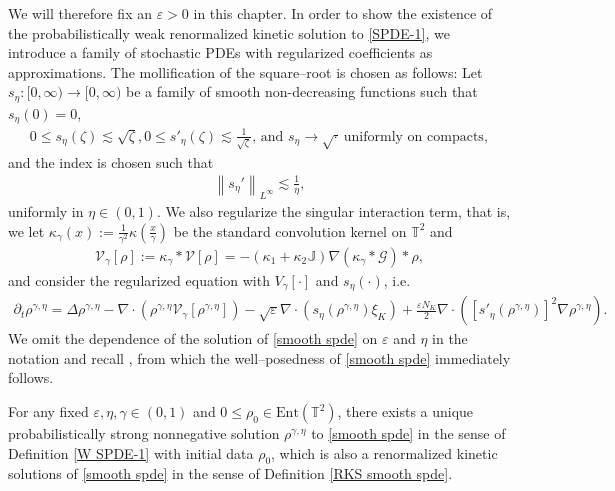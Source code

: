 We will therefore fix an $\varepsilon > 0$ in this chapter. In order to show the existence of the probabilistically weak renormalized kinetic solution to \eqref{SPDE-1}, we introduce a family of stochastic PDEs with regularized coefficients as approximations. The mollification of the square--root is chosen as follows: Let $s_{\eta}:[0, \infty) \rightarrow[0, \infty)$ be a family of smooth non-decreasing functions such that $s_{\eta}(0)=0$, 
\begin{align}
0 \leqslant s_{\eta}(\zeta) \lesssim \sqrt{\zeta}, 0 \leq s'_{\eta}(\zeta) \lesssim \frac{1}{\sqrt{\zeta}} \text {, and } s_{\eta} \to \sqrt{\cdot} \ \text{uniformly on compacts},
\end{align}
and the index is chosen such that
\begin{align}
\left\|s_{\eta}'\right\|_{L^{\infty}} \lesssim \frac{1}{\eta},
\end{align}
uniformly in $\eta \in (0,1)$. We also regularize the singular interaction term, that is, we let $\kappa_\gamma( x):=\frac{1}{\gamma^2} \kappa ( \frac{x}{\gamma})$ be the standard convolution kernel on $ \mathbb{T}^2$ and 
\begin{align}
\mathcal{V}_{\gamma}[\rho] := \kappa_{\gamma}\ast\mathcal{V}[\rho] =  -(\kappa_1 + \kappa_2 \mathbb{J}) \nabla (\kappa_{\gamma}\ast\mathcal{G}) \ast \rho,
\end{align}
and consider the regularized equation with $V_{\gamma}[\cdot]$ and $s_{\eta}(\cdot)$, i.e. 
\begin{align}\label{smooth spde}
\partial_t\rho^{\gamma, \eta}=\Delta\rho^{\gamma, \eta} -\nabla\cdot(\rho^{\gamma, \eta}\mathcal{V}_{{\gamma}}[\rho^{\gamma, \eta}])
- \sqrt{\varepsilon} \nabla\cdot(s_{\eta}(\rho^{\gamma, \eta})\xi_{K})
+\frac{\varepsilon N_{K}}{2}\nabla\cdot([s'_{\eta}(\rho^{\gamma, \eta})]^2\nabla\rho^{\gamma, \eta}).
\end{align}
We omit the dependence of the solution of \eqref{smooth spde} on $\varepsilon$ and $\eta$ in the notation and recall \cite[Theorem 5.6 and Proposition 5.9]{WWZ22}, from which the well--posedness of \eqref{smooth spde} immediately follows. 
\begin{prop}\label{entropy-mollified-DK-existence}
 For any fixed $\varepsilon,\eta,\gamma\in(0,1)$ and $0 \leq \rho_0 \in \mathrm{Ent}(\mathbb{T}^2)$, there exists a unique probabilistically strong nonnegative solution $\rho^{\gamma, \eta}$ to \eqref{smooth spde} in the sense of Definition \ref{W SPDE-1} with initial data $\rho_0$, which is also a renormalized kinetic solutions of \eqref{smooth spde} in the sense of Definition \ref{RKS smooth spde}.\end{prop}

